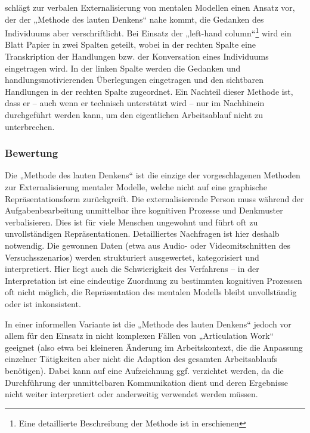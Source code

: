 \citet{Senge90} schlägt zur verbalen Externalisierung von mentalen Modellen einen Ansatz vor, der der „Methode des lauten Denkens“ nahe kommt, die Gedanken des Individuums aber verschriftlicht. Bei Einsatz der „left-hand column“\footnote{Eine detaillierte Beschreibung der Methode ist in \citep{Senge94} erschienen} wird ein Blatt Papier in zwei Spalten geteilt, wobei in der rechten Spalte eine Transkription der Handlungen bzw. der Konversation eines Individuums eingetragen wird. In der linken Spalte werden die Gedanken und handlungsmotivierenden Überlegungen eingetragen und den sichtbaren Handlungen in der rechten Spalte zugeordnet. Ein Nachteil dieser Methode ist, dass er -- auch wenn er technisch unterstützt wird -- nur im Nachhinein durchgeführt werden kann, um den eigentlichen Arbeitsablauf nicht zu unterbrechen.

\subsubsection{Bewertung}

Die „Methode des lauten Denkens“ \citep{Van-Someren94} ist die einzige der vorgeschlagenen Methoden zur Externalisierung mentaler Modelle, welche nicht auf eine graphische Repräsentationsform zurückgreift. Die externalisierende Person muss während der Aufgabenbearbeitung unmittelbar ihre kognitiven Prozesse und Denkmuster verbalisieren. Dies ist für viele Menschen ungewohnt und führt oft zu unvollständigen Repräsentationen. Detailliertes Nachfragen ist hier deshalb notwendig. Die gewonnen Daten (etwa aus Audio- oder Videomitschnitten des Versuchsszenarios) werden strukturiert ausgewertet, kategorisiert und interpretiert. Hier liegt auch die Schwierigkeit des Verfahrens -- in der Interpretation ist eine eindeutige Zuordnung zu bestimmten kognitiven Prozessen oft nicht möglich, die Repräsentation des mentalen Modells bleibt unvollständig oder ist inkonsistent. \citep[][S. 28]{Ifenthaler06}

In einer informellen Variante ist die „Methode des lauten Denkens“ jedoch vor allem für den Einsatz in nicht komplexen Fällen von „Articulation Work“ geeignet (also etwa bei kleineren Änderung im Arbeitskontext, die die Anpassung einzelner Tätigkeiten aber nicht die Adaption des gesamten Arbeitsablaufs benötigen). Dabei kann auf eine Aufzeichnung ggf. verzichtet werden, da die Durchführung der unmittelbaren Kommunikation dient und deren Ergebnisse nicht weiter interpretiert oder anderweitig verwendet werden müssen.

